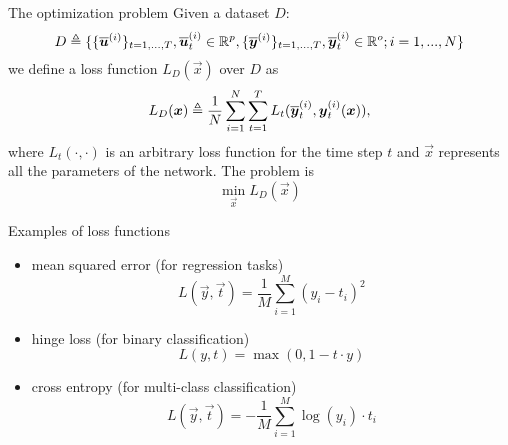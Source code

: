 \begin{frame}{The optimization problem}
Given a dataset $D$:
\begin{equation}
D\triangleq\{\{\overline{\boldsymbol{u}}^{(i)}\}_{t=1,...,T}, \overline{\boldsymbol{u}}^{(i)}_t \in \mathbb{R}^p, \{\overline{\boldsymbol{y}}^{(i)}\}_{t=1,...,T}, \overline{\boldsymbol{y}}^{(i)}_t \in \mathbb{R}^o;  i=1,...,N\}
\end{equation}
we define a loss function $L_D(\vec{x})$ over $D$  as
\begin{equation}
L_D(\boldsymbol{x})\triangleq\frac{1}{N}\sum_{i=1}^N \sum_{t=1}^T L_t(\overline{\boldsymbol{y}}_t^{(i)},\boldsymbol{y}_t^{(i)}(\boldsymbol{x})),
\end{equation}
where $L_t(\cdot, \cdot)$ is an arbitrary loss function for the time step $t$ and $\vec{x}$ represents all the parameters of the network.
The problem is \begin{equation}
\min_{\vec{x}} L_D(\vec{x})
\end{equation}
\end{frame}

\begin{frame}{Examples of loss functions}

	\begin{itemize}
		\item mean squared error (for regression tasks)
		\begin{equation}
			L(\vec{y}, \vec{t}) = \frac{1}{M}\sum_{i=1}^M (y_i-t_i)^2
		\end{equation}
		\item hinge loss (for binary classification)
		\begin{equation}
			L(y, t) = \max(0,1-t\cdot y )
		\end{equation}
		\item cross entropy (for multi-class classification)
		\begin{equation}
						L(\vec{y}, \vec{t}) = -\frac{1}{M}\sum_{i=1}^M \log(y_i)\cdot t_i
		\end{equation}
	\end{itemize}
\end{frame}

